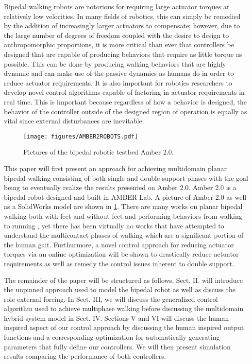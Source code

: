 Bipedal walking robots are notorious for requiring large actuator torques at relatively low velocities. In many fields of robotics, this
can simply be remedied by the addition of increasingly larger actuators to compensate; however, due to the large number of
degrees of freedom coupled with the desire to design to anthropomorphic proportions, it is more critical than ever that
controllers be designed that are capable of producing behaviors that require as little torque as possible. This
can be done by producing walking behaviors that are highly dynamic and can make use of the passive
dynamics as humans do in order to reduce actuator requirements. It is also important for
robotics researchers to develop novel control algorithms capable of factoring in actuator requirements in
real time. This is important because regardless of how a behavior is designed, the behavior of the
controller outside of the designed region of operation is equally as vital since external disturbances
are inevitable.
\begin{figure}[!]
\centering
\texttt{[image: figures/AMBER2ROBOTS.pdf]}
\caption{Pictures of the bipedal robotic testbed Amber 2.0.}
\label{fig:robots}
\end{figure}

This paper will first present an approach for achieving multidomain planar bipedal walking consisting of both
single and double support phases with the goal being to eventually realize the results presented on Amber 2.0. Amber
2.0 is a bipedal robot designed and built in AMBER Lab. A picture of Amber 2.0 as well as a SolidWorks model are
shown in \ref{fig:robots}. There are many works on planar bipedal walking both with feet \cite{CDG08}
and without feet \cite{SPPG10,YPA12} and performing behaviors from walking \cite{GCS2007} to running \cite{ZYA2012},
yet there has been virtually no works that have attempted to understand the multicontact phases of walking which
are a significant portion of the human gait. Furthurmore, a novel control approach for reducing actuator torques
via an online optimization will be shown to drastically reduce actuator requirements as well as remedy the
control issues inherent to double support.

The remainder of the paper will be structured as follows. Sect. II. will introduce the unpinned approach
used to model the bipedal robot as well as discuss the role external forcing. In Sect. III, we will
discuss the generalized control algorithm used to achieve multiphase walking before discussing the multidomain hybrid
system model in Sect. IV. Sections V and VI will discuss the human inspired aspect of our control approach by
discussing the human inspired output functions and a corresponding optimization for automatically generating
parameters that fully define our controllers. We will then present simulation results comparing the performance
of both controllers. 
